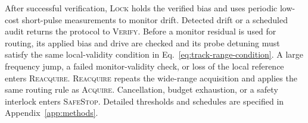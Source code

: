After successful verification, \textsc{Lock} holds the verified bias and uses
periodic low-cost short-pulse measurements to monitor drift. Detected drift or
a scheduled audit returns the protocol to \textsc{Verify}. Before a monitor
residual is used for routing, its applied bias and drive are checked and its
probe detuning must satisfy the same local-validity condition in
Eq.~\eqref{eq:track-range-condition}. A large frequency jump, a failed
monitor-validity check, or loss of the local reference enters
\textsc{Reacquire}.
\textsc{Reacquire} repeats the wide-range acquisition and applies the same
routing rule as \textsc{Acquire}. Cancellation, budget exhaustion, or a safety
interlock enters \textsc{SafeStop}. Detailed thresholds and schedules are
specified in Appendix~\ref{app:methods}.


